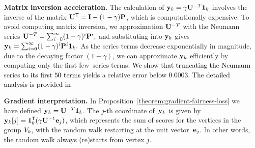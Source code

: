 \documentclass[sigconf, anonymous, review]{acmart}
\begin{document}
\noindent
\textbf{Matrix inversion acceleration.}
The calculation of $\mathbf{{y}}_k = \gamma \mathbf{{U}}^{-T} \mathbf{{1}}_{k}$ involves the inverse of the matrix $\mathbf{{U}}^{\mathsf{T}} = \mathbf{{I}} - (1 - \gamma) \mathbf{{P}}$, which is computationally expensive. To avoid computing matrix inversion, we approximation $\mathbf{{U}}^{-T}$ with the Neumann series
$    \mathbf{{U}}^{-T} = \sum_{i=0}^{\infty} (1-\gamma)^i \mathbf{{P}}^i,$
and substituting into $\mathbf{{y}}_k$ gives
$    \mathbf{{y}}_k = \sum_{i=0}^{\infty}(1-\gamma)^i \mathbf{{P}}^i \mathbf{{1}}_{k}. $
As the series terms decrease exponentially in mag\-ni\-tude, 
due to the decaying factor $(1-\gamma)$, 
we can approximate $\mathbf{{y}}_k$ efficiently 
by computing only the first few~series terms.
\textcolor{black}{We show that truncating the Neumann series to its first $50$ terms yields a relative error below $0.0003$. The detailed analysis is provided in }



\vspace{1mm}
\noindent
\textbf{Gradient interpretation.}
In Proposition~\ref{theorem:gradient-fairness-loss} we have defined
$\mathbf{{y}}_k = \mathbf{{U}}^{-T} \mathbf{{1}}_{k}$.
The $j$-th coordinate of~$\mathbf{{y}}_k$ is given by
$\mathbf{{y}}_{k}[j] = \mathbf{{1}}_{k}^{\mathsf{T}} (\gamma \mathbf{{U}}^{-1} \mathbf{e}_j)$,
which represents the sum of \pagerank scores for the vertices in the group $V_k$, with the random walk restarting at the unit vector~$\mathbf{{e}}_j$. In other words, the random walk always (re)\-starts from vertex $j$. 
\end{document}
